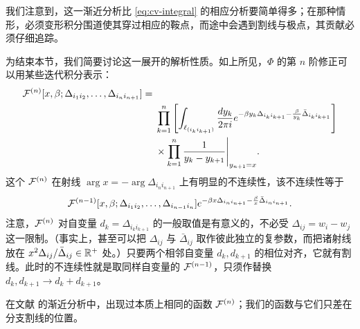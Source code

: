 我们注意到，这一渐近分析比 \eqref{eq:cv-integral} 的相应分析要简单得多；在那种情形，必须变形积分围道使其穿过相应的鞍点，而途中会遇到割线与极点，其贡献必须仔细追踪。

为结束本节，我们简要讨论这一展开的解析性质。如上所见，$\Phi$ 的第 $n$ 阶修正可以用某些迭代积分表示：
\begin{equation}\label{eq:appC-Fn}
\begin{aligned}
\mathcal{F}^{(n)}[x,\beta;\Delta_{i_1 i_2},\dots, \Delta_{i_{n} i_{n+1}}] ={}& \\
&\prod_{k=1}^n \left[ \int_{\ell_{(i_k i_{k+1})}} \frac{dy_k}{2 \pi i} e^{ -\beta y_k \Delta_{i_k i_{k+1}} -
\frac{\beta}{y_k} \bar \Delta_{i_k i_{k+1}} } \right] \\
&\times \prod_{k=1}^n
\frac{1}{y_k - y_{k+1}} \Bigg\vert_{y_{n+1} = x}.
\end{aligned}
\end{equation}
这个 $\mathcal{F}^{(n)}$ 在射线 $\arg x = -\arg \Delta_{i_n i_{n+1}}$ 上有明显的不连续性，该不连续性等于
\begin{equation}\label{eq:appC-disc}
\mathcal{F}^{(n-1)}[x,\beta;\Delta_{i_1 i_2}, \dots, \Delta_{i_{n-1}
i_{n}}]e^{ - \beta x \Delta_{i_{n} i_{n+1}} - \frac{\beta}{x} \bar
\Delta_{i_{n} i_{n+1}} }.
\end{equation}
注意，$\mathcal{F}^{(n)}$ 对自变量 $d_k = \Delta_{i_k i_{k+1}}$ 的一般取值是有意义的，不必受 $\Delta_{ij} = w_i-w_j$ 这一限制。（事实上，甚至可以把 $\Delta_{ij}$ 与 $\bar \Delta_{ij}$ 取作彼此独立的复参数，而把诸射线放在 $x^2 \Delta_{ij}/\bar \Delta_{ij} \in \mathbb{R}^+$ 处。）只要两个相邻自变量 $d_k, d_{k+1}$ 的相位对齐，它就有割线。此时的不连续性就是取同样自变量的 $\mathcal{F}^{(n-1)}$，只须作替换 $d_k, d_{k+1} \to d_k + d_{k+1}$。

在文献 \cite{Cecotti:1993rm} 的渐近分析中，出现过本质上相同的函数 $\mathcal{F}^{(n)}$；我们的函数与它们只差在分支割线的位置。
